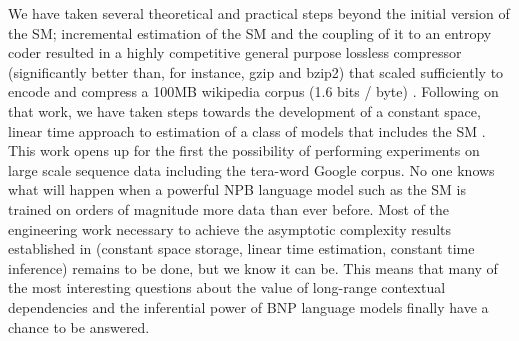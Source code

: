 \documentclass[12pt]{article}
\begin{document}
{We have taken several theoretical and practical steps beyond the initial version of the SM; incremental estimation of the SM and the coupling of it to an entropy coder resulted in a highly competitive general purpose lossless compressor (significantly better than, for instance, gzip and bzip2) that scaled sufficiently to encode and compress a 100MB wikipedia corpus (1.6 bits / byte) \citep{Gasthaus2010}.  Following on that work, we have taken steps towards the development of a constant space, linear time approach to estimation of a class of models that includes the SM  \citep{Bartlett2010}.  This work  opens up for the first the possibility of performing experiments on large scale sequence data including the tera-word Google corpus.   No one knows what will happen when a powerful NPB language model such as the SM is trained on orders of magnitude more data than ever before.  Most of the engineering work necessary to achieve the asymptotic complexity results established in \citep{Bartlett2010} (constant space storage, linear time estimation, constant time inference) remains to be done, but we know it can be.  This means that many of the most interesting questions about the value of long-range contextual dependencies and the inferential power of BNP language models finally have a chance to be answered.


}
\end{document}
